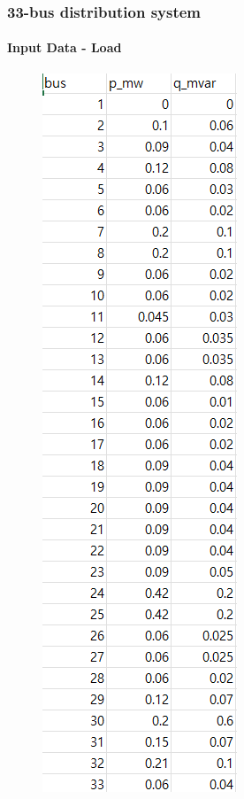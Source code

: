 \documentclass[
	11pt, %
	aspectratio=169, %
]{beamer}
\begin{document}
\begin{frame}
	\frametitle{33-bus distribution system}
	\framesubtitle{Input Data - Load}

	\begin{figure}[h]
		\centering
		\begin{minipage}[c]{0.08\textwidth}
			\centering
			\includegraphics[width=\linewidth,keepaspectratio]{load_info.png}

\end{minipage}
\end{figure}
\end{frame}
\end{document}
